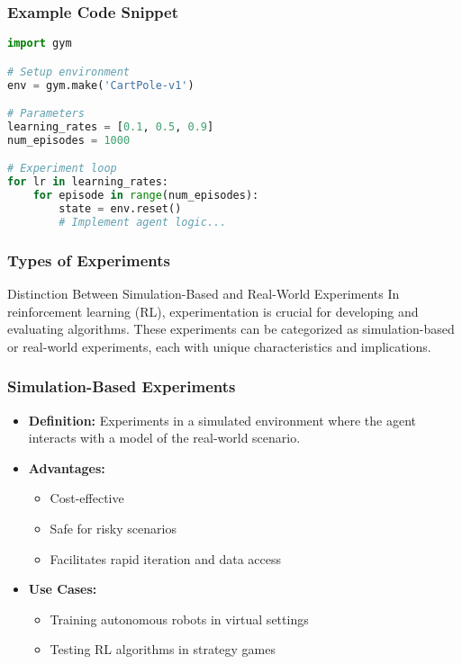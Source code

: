 \documentclass[aspectratio=169]{beamer}
\begin{document}
\begin{frame}[fragile]
    \frametitle{Example Code Snippet}
    \begin{lstlisting}[language=Python]
import gym

# Setup environment
env = gym.make('CartPole-v1')

# Parameters
learning_rates = [0.1, 0.5, 0.9]
num_episodes = 1000

# Experiment loop
for lr in learning_rates:
    for episode in range(num_episodes):
        state = env.reset()
        # Implement agent logic...
    \end{lstlisting}
\end{frame}

\begin{frame}
    \frametitle{Types of Experiments}
    \begin{block}{Distinction Between Simulation-Based and Real-World Experiments}
        In reinforcement learning (RL), experimentation is crucial for developing and evaluating algorithms. These experiments can be categorized as simulation-based or real-world experiments, each with unique characteristics and implications.
    \end{block}
\end{frame}

\begin{frame}[fragile]
    \frametitle{Simulation-Based Experiments}
    \begin{itemize}
        \item \textbf{Definition:} Experiments in a simulated environment where the agent interacts with a model of the real-world scenario.
        \item \textbf{Advantages:}
        \begin{itemize}
            \item Cost-effective
            \item Safe for risky scenarios
            \item Facilitates rapid iteration and data access
        \end{itemize}
        \item \textbf{Use Cases:}
        \begin{itemize}
            \item Training autonomous robots in virtual settings
            \item Testing RL algorithms in strategy games
        \end{itemize}
    \end{itemize}
\end{frame}
\end{document}
